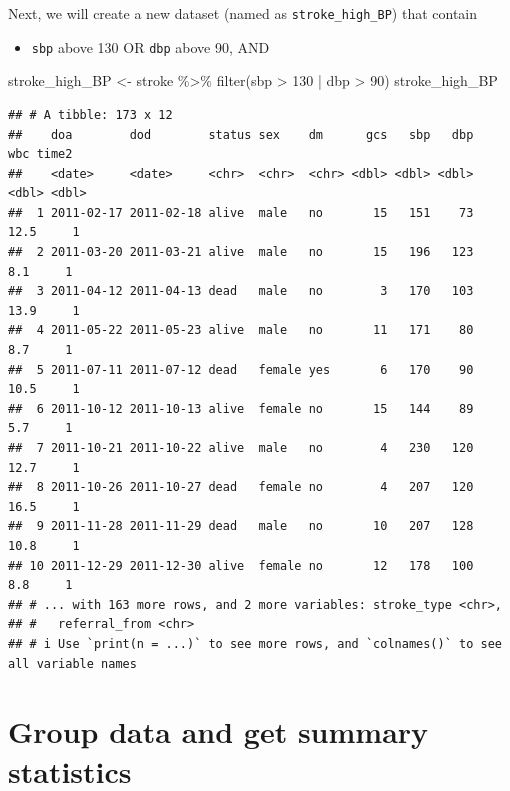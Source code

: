 \documentclass[
  10pt,
]{krantz}
\newenvironment{Shaded}{\begin{snugshade}}{\end{snugshade}}
\newcommand{\DecValTok}[1]{\textcolor[rgb]{0.00,0.00,0.81}{#1}}
\newcommand{\FunctionTok}[1]{\textcolor[rgb]{0.00,0.00,0.00}{#1}}
\newcommand{\NormalTok}[1]{#1}
\newcommand{\OtherTok}[1]{\textcolor[rgb]{0.56,0.35,0.01}{#1}}
\newcommand{\SpecialCharTok}[1]{\textcolor[rgb]{0.00,0.00,0.00}{#1}}
\providecommand{\tightlist}{%
  \setlength{\itemsep}{0pt}\setlength{\parskip}{0pt}}
\begin{document}
Next, we will create a new dataset (named as \texttt{stroke\_high\_BP}) that contain

\begin{itemize}
\tightlist
\item
  \texttt{sbp} above 130 OR \texttt{dbp} above 90, AND
\end{itemize}

\begin{Shaded}
\begin{Highlighting}[]
\NormalTok{stroke\_high\_BP }\OtherTok{\textless{}{-}}\NormalTok{ stroke }\SpecialCharTok{\%\textgreater{}\%} \FunctionTok{filter}\NormalTok{(sbp }\SpecialCharTok{\textgreater{}} \DecValTok{130} \SpecialCharTok{|}\NormalTok{ dbp }\SpecialCharTok{\textgreater{}} \DecValTok{90}\NormalTok{)}
\NormalTok{stroke\_high\_BP}
\end{Highlighting}
\end{Shaded}

\begin{verbatim}
## # A tibble: 173 x 12
##    doa        dod        status sex    dm      gcs   sbp   dbp   wbc time2
##    <date>     <date>     <chr>  <chr>  <chr> <dbl> <dbl> <dbl> <dbl> <dbl>
##  1 2011-02-17 2011-02-18 alive  male   no       15   151    73  12.5     1
##  2 2011-03-20 2011-03-21 alive  male   no       15   196   123   8.1     1
##  3 2011-04-12 2011-04-13 dead   male   no        3   170   103  13.9     1
##  4 2011-05-22 2011-05-23 alive  male   no       11   171    80   8.7     1
##  5 2011-07-11 2011-07-12 dead   female yes       6   170    90  10.5     1
##  6 2011-10-12 2011-10-13 alive  female no       15   144    89   5.7     1
##  7 2011-10-21 2011-10-22 alive  male   no        4   230   120  12.7     1
##  8 2011-10-26 2011-10-27 dead   female no        4   207   120  16.5     1
##  9 2011-11-28 2011-11-29 dead   male   no       10   207   128  10.8     1
## 10 2011-12-29 2011-12-30 alive  female no       12   178   100   8.8     1
## # ... with 163 more rows, and 2 more variables: stroke_type <chr>,
## #   referral_from <chr>
## # i Use `print(n = ...)` to see more rows, and `colnames()` to see all variable names
\end{verbatim}

\hypertarget{group-data-and-get-summary-statistics}{%
\section{\texorpdfstring{Group data and get summary statistics}{Group data and get summary statistics}}\label{group-data-and-get-summary-statistics}}
\end{document}
